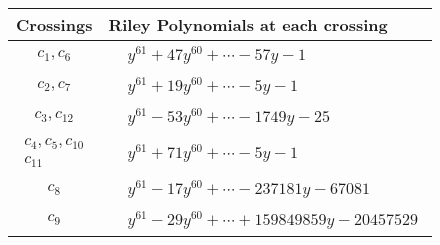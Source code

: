 \documentclass[1p]{elsarticle_modified}
\theoremstyle{definition}
\begin{document}
\begin{tabular}{m{50pt}|m{274pt}}
Crossings & \hspace{64pt}Riley Polynomials at each crossing \\
\hline $$\begin{aligned}c_{1},c_{6}\end{aligned}$$&$\begin{aligned}
&y^{61}+47 y^{60}+\cdots-57 y-1
\end{aligned}$\\
\hline $$\begin{aligned}c_{2},c_{7}\end{aligned}$$&$\begin{aligned}
&y^{61}+19 y^{60}+\cdots-5 y-1
\end{aligned}$\\
\hline $$\begin{aligned}c_{3},c_{12}\end{aligned}$$&$\begin{aligned}
&y^{61}-53 y^{60}+\cdots-1749 y-25
\end{aligned}$\\
\hline $$\begin{aligned}c_{4},c_{5},c_{10}\\c_{11}\end{aligned}$$&$\begin{aligned}
&y^{61}+71 y^{60}+\cdots-5 y-1
\end{aligned}$\\
\hline $$\begin{aligned}c_{8}\end{aligned}$$&$\begin{aligned}
&y^{61}-17 y^{60}+\cdots-237181 y-67081
\end{aligned}$\\
\hline $$\begin{aligned}c_{9}\end{aligned}$$&$\begin{aligned}
&y^{61}-29 y^{60}+\cdots+159849859 y-20457529
\end{aligned}$\\
\hline
\end{tabular}
\vskip 2pc
\end{document}

